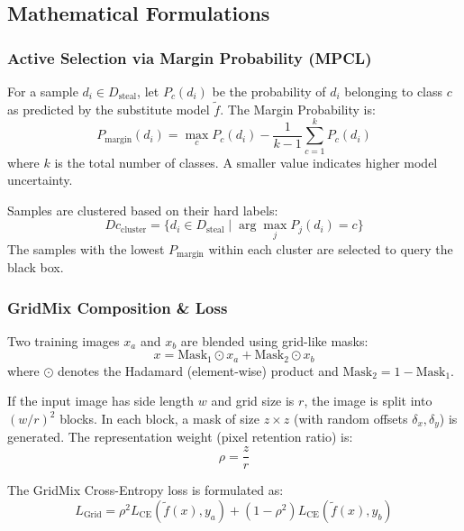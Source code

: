 \documentclass{article}
\begin{document}
\subsection{Mathematical Formulations}

\subsubsection{Active Selection via Margin Probability (MPCL)}
For a sample $d_i \in D_{\text{steal}}$, let $P_c(d_i)$ be the probability of $d_i$ belonging to class $c$ as predicted by the substitute model $\tilde{f}$. The Margin Probability is:
\begin{equation}
    P_{\text{margin}}(d_i) = \max_{c} P_c(d_i) - \frac{1}{k - 1} \sum_{c=1}^{k} P_c(d_i)
\end{equation}
where $k$ is the total number of classes. A smaller value indicates higher model uncertainty.

Samples are clustered based on their hard labels:
\begin{equation}
    Dc_{\text{cluster}} = \{d_i \in D_{\text{steal}} \mid \arg\max_j P_j(d_i) = c\}
\end{equation}
The samples with the lowest $P_{\text{margin}}$ within each cluster are selected to query the black box.

\subsubsection{GridMix Composition \& Loss}
Two training images $x_a$ and $x_b$ are blended using grid-like masks:
\begin{equation}
    x = \text{Mask}_1 \odot x_a + \text{Mask}_2 \odot x_b
\end{equation}
where $\odot$ denotes the Hadamard (element-wise) product and $\text{Mask}_2 = 1 - \text{Mask}_1$.

If the input image has side length $w$ and grid size is $r$, the image is split into $(w/r)^2$ blocks. In each block, a mask of size $z \times z$ (with random offsets $\delta_x, \delta_y$) is generated. The representation weight (pixel retention ratio) is:
\begin{equation}
    \rho = \frac{z}{r}
\end{equation}

The GridMix Cross-Entropy loss is formulated as:
\begin{equation}
    L_{\text{Grid}} = \rho^2 L_{\text{CE}}(\tilde{f}(x), y_a) + (1 - \rho^2) L_{\text{CE}}(\tilde{f}(x), y_b)
\end{equation}
\end{document}
